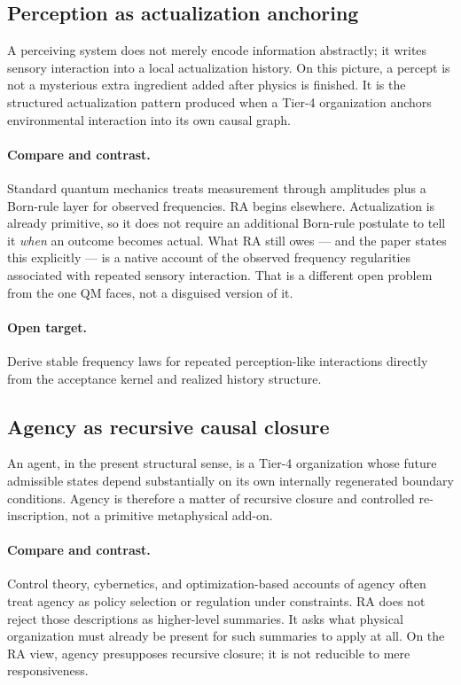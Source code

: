 \documentclass[11pt]{article}
\begin{document}
\subsection{Perception as actualization anchoring}

A perceiving system does not merely encode information abstractly; it writes sensory interaction into a local actualization history. On this picture, a percept is not a mysterious extra ingredient added after physics is finished. It is the structured actualization pattern produced when a Tier-4 organization anchors environmental interaction into its own causal graph.

\paragraph{Compare and contrast.} Standard quantum mechanics treats measurement through amplitudes plus a Born-rule layer for observed frequencies. RA begins elsewhere. Actualization is already primitive, so it does not require an additional Born-rule postulate to tell it \emph{when} an outcome becomes actual. What RA still owes --- and the paper states this explicitly --- is a native account of the observed frequency regularities associated with repeated sensory interaction. That is a different open problem from the one QM faces, not a disguised version of it.

\paragraph{Open target.} Derive stable frequency laws for repeated perception-like interactions directly from the acceptance kernel and realized history structure.

\subsection{Agency as recursive causal closure}

An agent, in the present structural sense, is a Tier-4 organization whose future admissible states depend substantially on its own internally regenerated boundary conditions. Agency is therefore a matter of recursive closure and controlled re-inscription, not a primitive metaphysical add-on.

\paragraph{Compare and contrast.} Control theory, cybernetics, and optimization-based accounts of agency often treat agency as policy selection or regulation under constraints. RA does not reject those descriptions as higher-level summaries. It asks what physical organization must already be present for such summaries to apply at all. On the RA view, agency presupposes recursive closure; it is not reducible to mere responsiveness.
\end{document}
